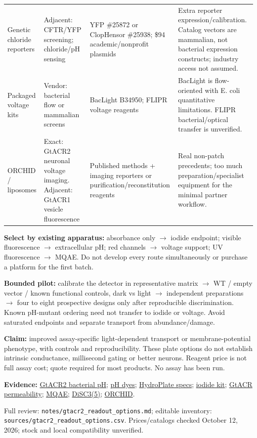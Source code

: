 \documentclass[10pt]{article}
\begin{document}
\begin{tabularx}{\linewidth}{@{}>{\raggedright\arraybackslash}p{1.2in}>{\raggedright\arraybackslash}p{1.65in}>{\raggedright\arraybackslash}p{1.65in}Y@{}}
Genetic chloride reporters & Adjacent: CFTR/YFP screening; chloride/pH sensing & YFP \#25872 or ClopHensor \#25938; \$94 academic/nonprofit plasmids & Extra reporter expression/calibration. Catalog vectors are mammalian, not bacterial expression constructs; industry access not assumed. \\
Packaged voltage kits & Vendor: bacterial flow or mammalian screens & BacLight B34950; FLIPR voltage reagents & BacLight is flow-oriented with E. coli quantitative limitations. FLIPR bacterial/optical transfer is unverified. \\
ORCHID / liposomes & Exact: GtACR2 neuronal voltage imaging. Adjacent: GtACR1 vesicle fluorescence & Published methods + imaging reporters or purification/reconstitution reagents & Real non-patch precedents; too much preparation/specialist equipment for the minimal partner workflow. \\
\bottomrule
\end{tabularx}

\textbf{Select by existing apparatus:} absorbance only $\rightarrow$ iodide endpoint; visible fluorescence $\rightarrow$ extracellular pH; red channels $\rightarrow$ voltage support; UV fluorescence $\rightarrow$ MQAE. Do not develop every route simultaneously or purchase a platform for the first batch.

\textbf{Bounded pilot:} calibrate the detector in representative matrix $\rightarrow$ WT / empty vector / known functional controls, dark vs light $\rightarrow$ independent preparations $\rightarrow$ four to eight prospective designs only after reproducible discrimination. Known pH-mutant ordering need not transfer to iodide or voltage. Avoid saturated endpoints and separate transport from abundance/damage.

\textbf{Claim:} improved assay-specific light-dependent transport or membrane-potential phenotype, with controls and reproducibility. These plate options do not establish intrinsic conductance, millisecond gating or better neurons. Reagent price is not full assay cost; quote required for most products. No assay has been run.

\scriptsize
\textbf{Evidence:}
\href{https://pmc.ncbi.nlm.nih.gov/articles/PMC6194965/}{GtACR2 bacterial pH};
\href{https://www.thermofisher.com/ca/en/home/references/molecular-probes-the-handbook/ph-indicators/probes-useful-at-near-neutral-ph.html}{pH dyes};
\href{https://www.presens.de/products/detail/hydroplate-hp96u}{HydroPlate specs};
\href{https://www.aatbio.com/products/screen-quest-colorimetric-chloride-channel-assay-kit}{iodide kit};
\href{https://pmc.ncbi.nlm.nih.gov/articles/PMC4764398/}{GtACR permeability};
\href{https://www.dojindo.com/products/M024/}{MQAE};
\href{https://www.aatbio.com/products/disc3-5-3-3-dipropylthiadicarbocyanine-iodide}{DiSC3(5)};
\href{https://www.nature.com/articles/s41467-024-53074-y}{ORCHID}.
\par
Full review: \texttt{notes/gtacr2\_readout\_options.md}; editable inventory: \texttt{sources/gtacr2\_readout\_options.csv}.
Prices/catalogs checked October 12, 2026; stock and local compatibility unverified.
\end{document}
